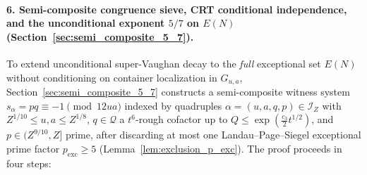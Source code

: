 \documentclass[11pt, a4paper]{article}
\theoremstyle{plain}
\theoremstyle{definition}
\begin{document}
\paragraph{6. Semi-composite congruence sieve, CRT conditional independence, and the unconditional exponent $5/7$ on $E(N)$ (Section~\ref{sec:semi_composite_5_7}).}
To extend unconditional super-Vaughan decay to the \emph{full} exceptional set $E(N)$ without conditioning on container localization in $G_{u,a}$, Section~\ref{sec:semi_composite_5_7} constructs a semi-composite witness system $s_\alpha=pq\equiv -1\pmod{12ua}$ indexed by quadruples $\alpha=(u,a,q,p)\in\mathcal{I}_Z$ with $Z^{1/10}\le u,a\le Z^{1/8}$, $q\in\mathcal{Q}$ a $t^6$-rough cofactor up to $Q\le\exp(\frac{c_3}{2}t^{1/2})$, and $p\in(Z^{9/10},Z]$ prime, after discarding at most one Landau--Page--Siegel exceptional prime factor $p_{\mathrm{exc}}\ge 5$ (Lemma~\ref{lem:exclusion_p_exc}). The proof proceeds in four steps:
\end{document}
